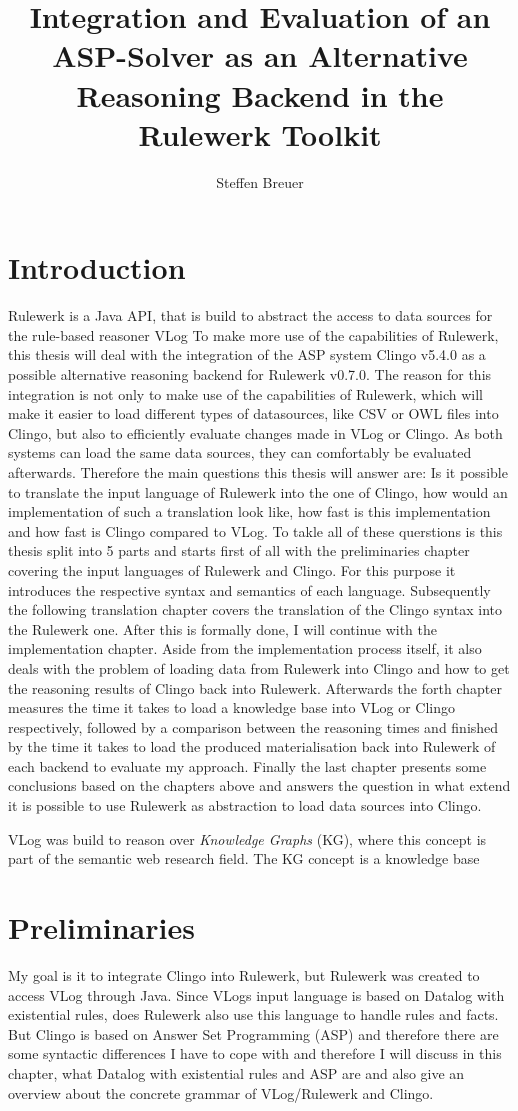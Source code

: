 \documentclass[hyperref, bachelorofscience]{cgvpub}
\author{Steffen Breuer}
\title{Integration and Evaluation of an ASP-Solver as an Alternative Reasoning Backend in the Rulewerk Toolkit}
\begin{document}
\chapter{Introduction}
Rulewerk is a Java API, that is build to abstract the access to data sources for the rule-based reasoner VLog  To make more use of the capabilities of Rulewerk, this thesis will deal with the integration of the ASP system Clingo v5.4.0 as a possible alternative reasoning backend for
Rulewerk v0.7.0. The reason for this integration is not only to make use of the capabilities of Rulewerk, which will make it easier to load different types of datasources, like CSV or OWL files into
Clingo, but also to efficiently evaluate changes made in VLog or Clingo. As both systems can
load the same data sources, they can comfortably be evaluated afterwards. Therefore the main questions this thesis will answer are: Is it possible to translate the input language of Rulewerk into the one of Clingo, how would an implementation of such a translation look like, how fast is this implementation and how fast is Clingo compared to VLog. To takle all of these querstions is this thesis split into 5 parts and starts first of all with the preliminaries chapter covering the
input languages of Rulewerk and Clingo. For this purpose it introduces the respective syntax
and semantics of each language. Subsequently the following translation chapter covers the
translation of the Clingo syntax into the Rulewerk one. After this is formally done, I will
continue with the implementation chapter. Aside from the implementation process itself, it
also deals with the problem of loading data from Rulewerk into Clingo and how to get the
reasoning results of Clingo back into Rulewerk. Afterwards the forth chapter measures the
time it takes to load a knowledge base into VLog or Clingo respectively, followed by a
comparison between the reasoning times and finished by the time it takes to load the produced materialisation back into Rulewerk of each backend to evaluate my approach. Finally
the last chapter presents some conclusions based on the chapters above and answers the
question in what extend it is possible to use Rulewerk as abstraction to load data sources into
Clingo.


VLog was build to reason over \textit{Knowledge Graphs} (KG), where this concept is part of the semantic web research field. The KG concept is a knowledge base 




\chapter{Preliminaries}
My goal is it to integrate Clingo into Rulewerk, but Rulewerk was created to access VLog through Java. Since VLogs input language is based on Datalog with existential rules, does Rulewerk also use this language to handle rules and facts. But Clingo is based on Answer Set Programming (ASP) and therefore there are some syntactic differences I have to cope with and therefore I will discuss in this chapter, what Datalog with existential rules and ASP are and also give an overview about the concrete grammar of VLog/Rulewerk and Clingo. \\
\end{document}
